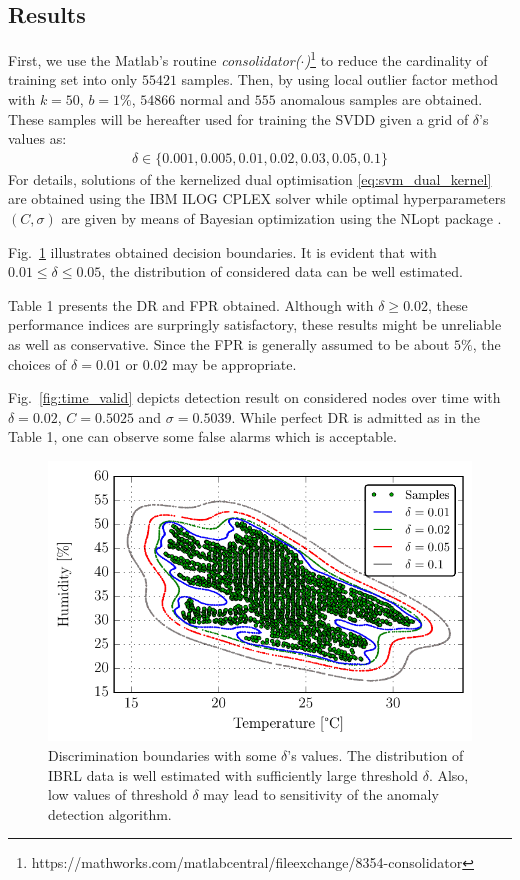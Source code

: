 \documentclass[conference]{IEEEtran}
\theoremstyle{problemstyle}
\begin{document}
\subsection{Results}

First, we use the Matlab's routine \emph{consolidator($\cdot$)}\footnote{https://mathworks.com/matlabcentral/fileexchange/8354-consolidator} to reduce the cardinality of training set into only $55421$ samples. Then, by using local outlier factor method with $k = 50 \text{, } b = 1 \%$, $54866$ normal and $555$ anomalous samples are obtained. These samples will be hereafter used for training the SVDD given a grid of $\delta$'s values as:
\begin{align}
\delta \in \{ 0.001, 0.005, 0.01, 0.02, 0.03, 0.05, 0.1 \}
\end{align}
For details, solutions of the kernelized dual optimisation \eqref{eq:svm_dual_kernel} are obtained using the IBM ILOG CPLEX solver while optimal hyperparameters $(C,\sigma)$ are given by means of Bayesian optimization using the NLopt package \cite{nlopt}.

Fig.~\ref{fig:domain_boundary} illustrates obtained decision boundaries. It is evident that with $0.01 \le \delta \le 0.05$, the distribution of considered data can be well estimated. 

Table 1 presents the DR and FPR obtained. Although with $\delta \ge 0.02$, these performance indices are surpringly satisfactory, these results might be unreliable as well as conservative. Since the FPR is generally assumed to be about $5 \%$, the choices of $\delta=0.01$ or $0.02$ may be appropriate. 

Fig.~\ref{fig:time_valid} depicts detection result on considered nodes over time with $\delta=0.02$, $C=0.5025$ and $\sigma=0.5039$. While perfect DR is admitted as in the Table 1, one can observe some false alarms which is acceptable.

\begin{figure}
\centering
\includegraphics[scale=.6]{Figs/data_description.pdf}
\caption{Discrimination boundaries with some $\delta$'s values. The distribution of IBRL data is well estimated with sufficiently large threshold $\delta$. Also, low values of threshold $\delta$ may lead to sensitivity of the anomaly detection algorithm.}
\label{fig:domain_boundary}
\end{figure}
 
\end{document}
